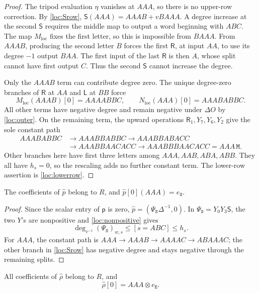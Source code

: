\documentclass[a4paper,11pt]{amsart}
\newcommand{\wordstart}{\mathtt{S}}
\newcommand{\wordmiddle}{\mathtt{M}}
\newcommand{\wordend}{\mathtt{E}}
\newcommand{\startmap}{{\Psi}_{{\wordstart}}}
\newcommand{\pp}{\mathsf p}
\newcommand{\tpar}{v}
\newcommand{\vpar}{{\tpar^{-1}}}
\numberwithin{equation}{subsection}
\theoremstyle{plain}
\theoremstyle{definition}
\theoremstyle{remark}
\begin{document}
\begin{proof}
The tripod evaluation $\eta$ vanishes at $AAA$, so there is no
upper-row correction.
By \autoref{loc:Srow}, $\mathsf S(AAA)=AAAB+\tpar BAAA$.
A degree increase at the second $\mathsf S$ requires the middle
map to output a word beginning with $ABC$. The map
$M_{\mathrm{loc}}$ fixes the first letter, so this is impossible
from $BAAA$. From $AAAB$, producing the second letter $B$ forces
the first $\mathsf R$, at input $AA$, to use its degree $-1$
output $BAA$. The first input of the last $\mathsf R$ is then $A$,
whose split cannot have first output $C$. Thus the second
$\mathsf S$ cannot increase the degree.

Only the $AAAB$ term can contribute degree zero. The unique
degree-zero branches of $\mathsf R$ at $AA$ and $\mathsf L$ at $BB$ force
\[
M_{\mathrm{loc}}(AAAB)[0]=AAAABBC,\qquad N_{\mathrm{loc}}(AAA)[0]=AAABABBC.
\]
All other terms have negative degree and remain negative under
$\Delta O$ by \autoref{loc:outer}. On the remaining term, the upward
operations $\mathsf R_1,Y_7,Y_6,Y_2$ give the sole constant path
\[
\begin{aligned}
AAABABBC&\to AAABBABBC\to AAABBABACC\\
&\to AAABBAACACC\to AAABBBAACACC=AAA\,\wordmiddle.
\end{aligned}
\]
Other branches here have first three letters among $AAA,AAB,ABA,ABB$.
They all have $h_s=0$, so the rescaling adds no further constant term.
The lower-row assertion is \autoref{loc:lowerrow}.
\end{proof}

\begin{lemma}\label{loc:initial}
The coefficients of $\widehat p$ belong to $R$, and
$\widehat p[0](AAA)=e_{\wordstart}$.
\end{lemma}

\begin{proof}
Since the scalar entry of $\pp$ is zero,
$\widehat p=(\startmap\Delta^{-1},0)$. In $\startmap=Y_0Y_3\mathsf S$, the two $Y$'s
are nonpositive and \autoref{loc:nonpositive} gives
\[
\deg_{\vpar} (\startmap)_{w,s}\le[s=ABC]\le h_s.
\]
For $AAA$, the constant path is
$AAA\to AAAB\to AAAAC\to ABAAAC$; the other branch in
\autoref{loc:Srow} has negative degree and stays negative through the remaining splits.
\end{proof}

\begin{lemma}\label{loc:terminal}
All coefficients of $\widehat\rho$ belong to $R$, and
\[
\widehat\rho[0]=AAA\otimes e_{\wordend}.
\]
\end{lemma}
\end{document}
